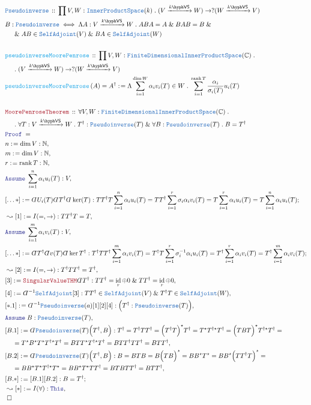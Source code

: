 \documentclass[12pt]{scrartcl}%
\newcommand{\TYPE}[1]{\textcolor{NavyBlue}{\mathtt{#1}}}%
\newcommand{\FUNC}[1]{\textcolor{Cerulean}{\mathtt{#1}}}%
\newcommand{\LOGIC}[1]{\textcolor{Blue}{\mathtt{#1}}}%
\newcommand{\THM}[1]{\textcolor{Maroon}{\mathtt{#1}}}%
\renewcommand{\.}{\; . \;} %
\newcommand{\de}{: \kern 0.1pc =} %
\newcommand{\Act}[1]{\left( #1 \right)} %
\newcommand{\Theorem}[2]{& \THM{#1} \, :: \, #2 \\ & \Proof = \\ } %
\newcommand{\DeclareType}[2]{& \TYPE{#1} \, :: \, #2 \\}%
\newcommand{\DefineType}[3]{& #1 : \TYPE{#2} \iff #3 \\}%
\newcommand{\DeclareFunc}[2]{& \FUNC{#1} \, :: \, #2 \\}%
\newcommand{\DefineNamedFunc}[4]{&  \FUNC{#1}\Act{#2} = #3 \de #4 \\}%
\newcommand{\NewLine}{\\ & \kern 1pc}%
\newcommand{\Page}[1]{ \begin{align*} #1 \end{align*}  }%
\newcommand{ \bd }{ \ByDef }%
\renewcommand{\And}{\; \& \;}%
\newcommand{\Complex}{\mathbb{C}}%
\newcommand{\Nat}{\mathbb{N}}%
\DeclareMathOperator*{\id}{id}%
\newcommand{\Say}[3]{& #1 \de #2 : #3, \\} %
\newcommand{\Conclude}[3]{& #1 \de #2 : #3; \\}%
\newcommand{\Derive}[3]{& \leadsto #1 \de #2 : #3, \\} %
\newcommand{\Assume}[2]{& \LOGIC{Assume} \; #1 : #2, \\} %
\newcommand{\QED}{\; \square} %
\newcommand{\EndProof}{& \QED \\} %
\newcommand{\ByDef}{\rotatebox[origin=c]{-180}{$D$}}%
\newcommand{\Proof}{\LOGIC{Proof} \; } %
\newcommand{\Arrow}[1]{\xrightarrow{#1}}%
\DeclareMathOperator{\rank}{rank} %
\newcommand{\IPS}{\TYPE{InnerProductSpace}}
\newcommand{\FDIPS}{\TYPE{FiniteDimensionalInnerProductSpace}}
\newcommand{\SA}{\TYPE{SelfAdjoint}}
\newcommand{\PI}{\TYPE{Pseudoinverse}}
\newcommand{\VS}[1]{#1\hyph\mathsf{VS}} %
\begin{document}
\Page{
	\DeclareType{\PI}{\prod V,W : \IPS(k) \.   (V \Arrow{\VS{k}} W) \to ?(W \Arrow{\VS{k}} V)}
	\DefineType{ B }{\PI}{\Lambda A : V \Arrow{\VS{k}} W \.  ABA = A \And BAB = B \And  \NewLine \And  AB \in \SA(V) \And BA \in \SA(W)}
	\\
	\DeclareFunc{pseudoinverseMoorePenrose}{ \prod V,W : \FDIPS(\Complex) \. \NewLine \.(V \Arrow{\VS{k}} W) \to ?(W \Arrow{\VS{k}} V)}
	\DefineNamedFunc{pseudoinverseMoorePenrose}{A}{A^\dagger}{\Lambda \sum^{\dim W}_{i=1} \alpha_iv_i(T) \in W \. \sum^{\rank T}_{i= 1} \frac{\alpha_i}{\sigma_i(T)}u_i(T)} 
	\\
	\Theorem{MoorePenroseTheorem}{\forall V,W : \FDIPS(\Complex) \. \NewLine \. \forall T : V \Arrow{\VS{k}} W \. T^\dagger : \PI(T) \And \forall B : \PI(T) \. B = T^\dagger} 
	\Say{n}{\dim V}{\Nat}
	\Say{m}{\dim V}{\Nat}
	\Say{r}{\rank T}{\Nat}
	\Assume{\sum^n_{i=1} \alpha_i u_i(T)}{V}
	\Conclude{[\ldots*]}{ \bd U_i(T)\bd T^\dagger \bd \ker(T)}
	{
		TT^\dagger T \sum^n_{i=1} \alpha_i u_i(T) = 
		TT^\dagger \sum^r_{i=1} \sigma_i \alpha_i v_i(T) = 
		T \sum^r_{i = 1} \alpha_i u_i(T) = 
		T \sum^n_{i = 1} \alpha_i u_i(T)
	}
	\Derive{[1]}{I(=,\to)}{TT^\dagger T = T }
	\Assume{\sum^m_{i=1} \alpha_i v_i(T)}{V}
	\Conclude{[\ldots*]}{ \bd T^\dagger \bd v(T) \bd \ker T^\dagger}
	{
		T^\dagger T T^\dagger \sum^m_{i=1} \alpha_i v_i(T) = 
		T^\dagger T \sum^r_{i=1} \sigma_i^{-1} \alpha_i u_i(T) = 
		T^\dagger \sum^r_{i = 1} \alpha_i v_i(T) = 
		T^\dagger \sum^m_{i = 1} \alpha_i v_i(T)
	}
	\Derive{[2]}{I(=,\to)}{T^\dagger TT^\dagger   = T^\dagger }
	\Say{[3]}{\THM{SingularValueTHM}\bd T^\dagger}{  TT^\dagger = \id_r \oplus 0 \And TT^\dagger = \id_r \oplus 0  }
	\Say{[4]}{\bd^{-1}\SA[3]}{ TT^\dagger \in \SA(V) \And  T^\dagger T \in \SA(W) }
	\Say{[*.1]}{\bd^{-1} \PI(a)[1][2][4]}{ \Big(T^\dagger : \PI(T)\Big) }
	\Assume{B}{\PI(T)}
	\Say{[B.1]}{\bd \PI(T)\Big( T^\dagger, B \Big)}{
		T^\dagger = 
		T^\dagger T T^\dagger =
		\Big( T^\dagger T \Big)^\star T^\dagger =
		T^\star T^{\dagger \star} T^\dagger = 
		\Big( T B T  \Big)^\star T^{\dagger \star} T^\dagger = \NewLine =
		T^\star B^\star T^\star T^{\dagger \star} T^\dagger = 
		B T T^\star T^{\dagger \star} T^\dagger = 
		B T T^\dagger T T^\dagger  = 
		B T T^\dagger
	} 
	\Say{[B.2]}{\bd \PI(T)\Big( T^\dagger, B \Big)}{
		B = 
		B T B  =
		B \Big(  T B \Big)^\star  =
		B B^\star T^{\star}  = 
		B B^\star \Big( T T^\dagger T  \Big)^\star  = \NewLine = 
		B B^\star T^\star T^{\dagger \star} T^\star = 
		B B^\star T^\star  T  T^{\dagger}  = 
		B T B  T T^\dagger  = 
		B T T^\dagger
	}
	\Conclude{[B.*]}{[B.1][B.2]}{B = T^\dagger}
	\Derive{[*]}{I(\forall)}{\LOGIC{This}}
	\EndProof
}
\newpage
\end{document}

